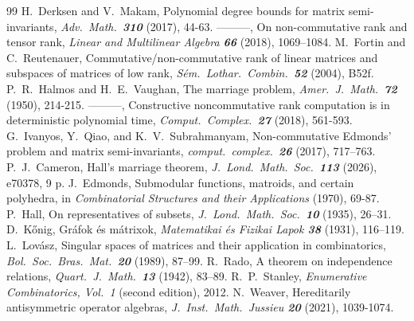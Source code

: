 \documentclass[10pt,a4paper]{amsart}
\begin{document}
\begin{thebibliography}{99}
 H.\ Derksen and V.\ Makam, Polynomial degree bounds for matrix semi-invariants, {\it Adv.\ Math.\ \bf 310} (2017), 44-63.
 {---------}, On non-commutative rank and tensor rank, {\it Linear and Multilinear Algebra \bf 66} (2018), 1069–1084.
 M.\ Fortin and C.\ Reutenauer, Commutative/non-commutative rank of linear matrices and subspaces of matrices of low rank, {\it S\'{e}m.\ Lothar.\ Combin.\ \bf 52} (2004), B52f.
 P.\ R.\ Halmos and H.\ E.\ Vaughan, The marriage problem, {\it Amer.\ J.\ Math.\ \bf 72} (1950), 214-215.
 {---------}, Constructive noncommutative rank computation is in deterministic polynomial time, {\it Comput.\ Complex.\ \bf 27} (2018), 561-593.
 G.\ Ivanyos, Y.\ Qiao, and K.\ V.\ Subrahmanyam, Non-commutative Edmonds’ problem and matrix semi-invariants, {\it comput.\ complex.\ \bf 26} (2017), 717–763.
 P.\ J.\ Cameron, Hall's marriage theorem, {\it J.\ Lond.\ Math.\ Soc.\ \bf 113} (2026), e70378, 9 p.
 J.\ Edmonds, Submodular functions, matroids, and certain polyhedra, in {\it Combinatorial Structures and their Applications} (1970), 69-87.
 P.\ Hall, On representatives of subsets, {\it J.\ Lond.\ Math.\ Soc.\ \bf 10} (1935), 26–31.
 D.\ Kőnig, Gráfok és mátrixok, {\it Matematikai és Fizikai Lapok \bf 38} (1931), 116–119.
 L.\ Lovász, Singular spaces of matrices and their application in combinatorics, {\it Bol.\ Soc.\ Bras.\ Mat.\ \bf 20} (1989), 87–99.
 R.\ Rado, A theorem on independence relations, {\it Quart.\ J.\ Math.\ \bf 13} (1942), 83–89.
 R.\ P.\ Stanley, {\it Enumerative Combinatorics, Vol.\ 1} (second edition), 2012.
 N.\ Weaver, Hereditarily antisymmetric operator algebras, {\it J.\ Inst.\ Math.\ Jussieu \bf 20} (2021), 1039-1074.
\end{thebibliography}
\end{document}
